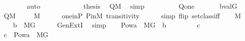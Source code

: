 \begin{isabellebody}
\ \ \ \ \ \ \isamarkupfalse%
\ auto\isanewline
\ \ \ \ \isamarkupfalse%
\ \isanewline
\ \ \ \ \isamarkupfalse%
\ {\isacharquery}{\kern0pt}thesis\ \isamarkupfalse%
\ {\isacartoucheopen}Q{\isasymin}M{\isacartoucheclose}\ \isamarkupfalse%
\ simp\isanewline
\ \ \isamarkupfalse%
\isanewline
\ \ \isamarkupfalse%
\isanewline
\ \ \ \ {\isacharquery}{\kern0pt}{\isasympi}{\isacharequal}{\kern0pt}{\isachardoublequoteopen}{\isacharquery}{\kern0pt}Q{\isasymtimes}{\isacharbraceleft}{\kern0pt}one{\isacharbraceright}{\kern0pt}{\isachardoublequoteclose}\isanewline
\ \ \isamarkupfalse%
\isanewline
\ \ \ \ {\isacharquery}{\kern0pt}b{\isacharequal}{\kern0pt}{\isachardoublequoteopen}val{\isacharparenleft}{\kern0pt}G{\isacharcomma}{\kern0pt}{\isacharquery}{\kern0pt}{\isasympi}{\isacharparenright}{\kern0pt}{\isachardoublequoteclose}\isanewline
\ \ \isamarkupfalse%
\ {\isacartoucheopen}{\isacharquery}{\kern0pt}Q{\isasymin}M{\isacartoucheclose}\ \isanewline
\ \ \isamarkupfalse%
\ {\isachardoublequoteopen}{\isacharquery}{\kern0pt}{\isasympi}{\isasymin}M{\isachardoublequoteclose}\isanewline
\ \ \ \ \isamarkupfalse%
\ one{\isacharunderscore}{\kern0pt}in{\isacharunderscore}{\kern0pt}P\ P{\isacharunderscore}{\kern0pt}in{\isacharunderscore}{\kern0pt}M\ transitivity\isanewline
\ \ \ \ \isamarkupfalse%
\ {\isacharparenleft}{\kern0pt}simp\ flip{\isacharcolon}{\kern0pt}\ setclass{\isacharunderscore}{\kern0pt}iff{\isacharparenright}{\kern0pt}\isanewline
\ \ \isamarkupfalse%
\ {\isacartoucheopen}{\isacharquery}{\kern0pt}{\isasympi}{\isasymin}M{\isacartoucheclose}\ \isanewline
\ \ \isamarkupfalse%
\ {\isachardoublequoteopen}{\isacharquery}{\kern0pt}b\ {\isasymin}\ M{\isacharbrackleft}{\kern0pt}G{\isacharbrackright}{\kern0pt}{\isachardoublequoteclose}\isanewline
\ \ \ \ \isamarkupfalse%
\ GenExtI\ \isamarkupfalse%
\ simp\isanewline
\ \ \isamarkupfalse%
\ {\isachardoublequoteopen}Pow{\isacharparenleft}{\kern0pt}a{\isacharparenright}{\kern0pt}\ {\isasyminter}\ M{\isacharbrackleft}{\kern0pt}G{\isacharbrackright}{\kern0pt}\ {\isasymsubseteq}\ {\isacharquery}{\kern0pt}b{\isachardoublequoteclose}\isanewline
\ \ \isamarkupfalse%
\isanewline
\ \ \ \ \isamarkupfalse%
\ c\isanewline
\ \ \ \ \isamarkupfalse%
\ {\isachardoublequoteopen}c\ {\isasymin}\ Pow{\isacharparenleft}{\kern0pt}a{\isacharparenright}{\kern0pt}\ {\isasyminter}\ M{\isacharbrackleft}{\kern0pt}G{\isacharbrackright}{\kern0pt}{\isachardoublequoteclose}\isanewline

\end{isabellebody}
